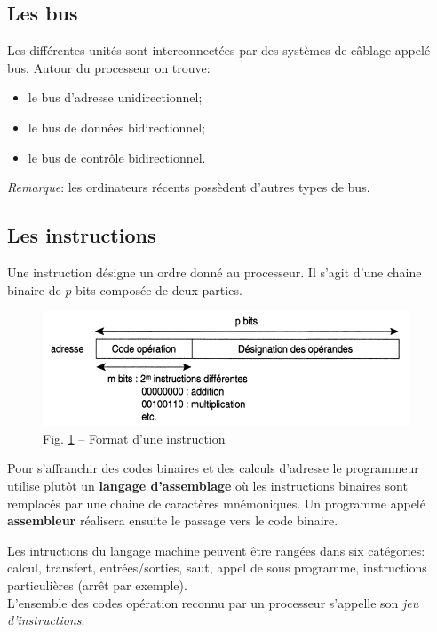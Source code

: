 \documentclass[11pt,french]{article}
\makeatletter
\def\maxwidth{\ifdim\Gin@nat@width>\linewidth\linewidth
    \else\Gin@nat@width\fi}
\let\Oldincludegraphics\includegraphics
\renewcommand{\includegraphics}[1]{\Oldincludegraphics[width=.8\maxwidth]{#1}}
\providecommand{\tightlist}{%
      \setlength{\itemsep}{0pt}\setlength{\parskip}{0pt}}
\makeatother
\begin{document}
\hypertarget{les-bus}{%
\subsection{Les bus}\label{les-bus}}
  Les différentes unités sont interconnectées par des systèmes de
  câblage appelé bus. Autour du processeur on trouve:


\begin{itemize}
\tightlist
\item
  le bus d'adresse unidirectionnel;
\item
  le bus de données bidirectionnel;
\item
  le bus de contrôle bidirectionnel.
\end{itemize}

\emph{Remarque}: les ordinateurs récents possèdent d'autres types de
bus.

\hypertarget{les-instructions}{%
\subsection{Les instructions}\label{les-instructions}}

Une instruction désigne un ordre donné au processeur. Il s'agit d'une
chaine binaire de \(p\) bits composée de deux parties.
\begin{figure}[h]
	\begin{center}
		\includegraphics{../img/as_instruction.jpg} 
	\end{center}
	\caption{Fig. \ref{fig:les-instructions} -- Format d'une instruction}
	\label{fig:les-instructions}
\end{figure}

Pour s'affranchir des codes
binaires et des calculs d'adresse le programmeur utilise plutôt un
\textbf{langage d'assemblage} où les instructions binaires sont
remplacés par une chaine de caractères mnémoniques. Un programme appelé
\textbf{assembleur} réalisera ensuite le passage vers le code binaire.\par
Les intructions du langage machine peuvent être rangées dans six
catégories: calcul, transfert, entrées/sorties, saut, appel de sous
programme, instructions particulières (arrêt par exemple).\\
L'ensemble des codes opération reconnu par un processeur s'appelle son
\emph{jeu d'instructions}.\\ 
\end{document}
